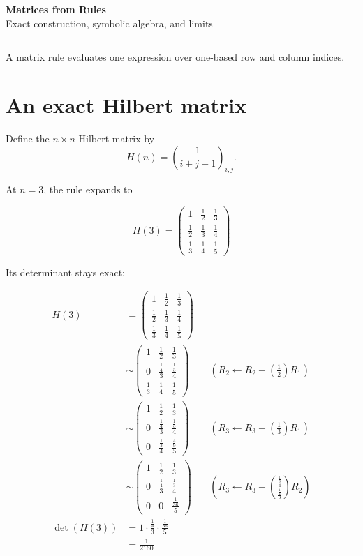 \documentclass[11pt]{article}
\begin{document}
\begin{center}{\Large\bfseries Matrices from Rules}\\[0.35em]{\large Exact construction, symbolic algebra, and limits}\end{center}
\vspace{0.25em}\hrule\vspace{1em}
A matrix rule evaluates one expression over one-based row and column indices.

\section*{An exact Hilbert matrix}
Define the \(n\times n\) Hilbert matrix by
\[H(n)=\left(\frac{1}{i+j-1}\right)_{i,j}.\]

At \(n=3\), the rule expands to

\[H\left(3\right) = \begin{pmatrix}1 & \frac{1}{2} & \frac{1}{3} \\ \frac{1}{2} & \frac{1}{3} & \frac{1}{4} \\ \frac{1}{3} & \frac{1}{4} & \frac{1}{5}\end{pmatrix}\]

Its determinant stays exact:

\[\begin{aligned}H\left(3\right) &= \begin{pmatrix}1 & \frac{1}{2} & \frac{1}{3} \\ \frac{1}{2} & \frac{1}{3} & \frac{1}{4} \\ \frac{1}{3} & \frac{1}{4} & \frac{1}{5}\end{pmatrix} \\
&\sim \begin{pmatrix}1 & \frac{1}{2} & \frac{1}{3} \\ 0 & \frac{\frac{1}{4}}{3} & \frac{\frac{1}{3}}{4} \\ \frac{1}{3} & \frac{1}{4} & \frac{1}{5}\end{pmatrix} && \left(R_{2}\leftarrow R_{2}-\left(\frac{1}{2}\right)R_{1}\right) \\
&\sim \begin{pmatrix}1 & \frac{1}{2} & \frac{1}{3} \\ 0 & \frac{\frac{1}{4}}{3} & \frac{\frac{1}{3}}{4} \\ 0 & \frac{\frac{1}{3}}{4} & \frac{\frac{4}{9}}{5}\end{pmatrix} && \left(R_{3}\leftarrow R_{3}-\left(\frac{1}{3}\right)R_{1}\right) \\
&\sim \begin{pmatrix}1 & \frac{1}{2} & \frac{1}{3} \\ 0 & \frac{\frac{1}{4}}{3} & \frac{\frac{1}{3}}{4} \\ 0 & 0 & \frac{\frac{1}{36}}{5}\end{pmatrix} && \left(R_{3}\leftarrow R_{3}-\left(\frac{\frac{\frac{1}{3}}{4}}{\frac{\frac{1}{4}}{3}}\right)R_{2}\right) \\
\det\left(H\left(3\right)\right) &= 1\cdot \frac{\frac{1}{4}}{3}\cdot \frac{\frac{1}{36}}{5} \\
&= \frac{1}{2160}\end{aligned}\]
\end{document}
